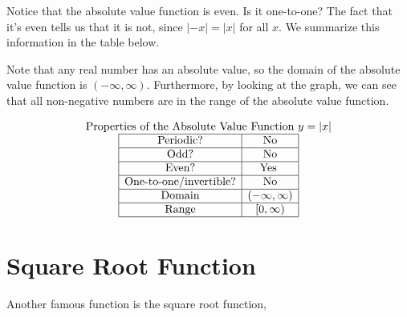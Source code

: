 \documentclass[nooutcomes]{ximera}
\begin{document}
Notice that the absolute value function is even. Is it one-to-one? The fact that it's even tells us that it is not, since $|-x| = |x|$ for all $x$. We summarize this information in the table below.


Note that any real number has an absolute value, so the domain of the absolute value function is $(-\infty, \infty)$. Furthermore, by looking at the graph, we can see that all non-negative numbers are in the range of the absolute value function.

\[
\begin{array}{c }
\text{\normalfont Properties of the Absolute Value Function } y=|x| \\
\begin{array}{|c|c|}
 \hline
\text{Periodic?} & \text{No} \\ \hline
\text{Odd?} & \text{No} \\ \hline
\text{Even?} & \text{Yes } \\ \hline
\text{One-to-one/invertible?} & \text{No}\\ \hline
\text{Domain} & (-\infty,\infty)\\ \hline
\text{Range} & [0,\infty)\\ \hline
\end{array}
\end{array}
\]


\newpage


\section{Square Root Function}
Another famous function is the square root function,

\begin{center}
\end{center}

\begin{center}
\end{center}
\end{document}
